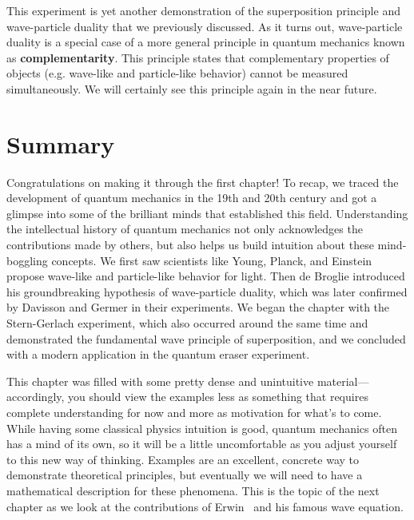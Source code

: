 This experiment is yet another demonstration of the superposition principle and wave-particle duality that we previously discussed. As it turns out, wave-particle duality is a special case of a more general principle in quantum mechanics known as \textbf{complementarity}. This principle states that complementary properties of objects (e.g. wave-like and particle-like behavior) cannot be measured simultaneously. We will certainly see this principle again in the near future.


\section{Summary}
Congratulations on making it through the first chapter! To recap, we traced the development of quantum mechanics in the 19th and 20th century and got a glimpse into some of the brilliant minds that established this field. Understanding the intellectual history of quantum mechanics not only acknowledges the contributions made by others, but also helps us build intuition about these mind-boggling concepts. We first saw scientists like Young, Planck, and Einstein propose wave-like and particle-like behavior for light. Then de Broglie introduced his groundbreaking hypothesis of wave-particle duality, which was later confirmed by Davisson and Germer in their experiments. We began the chapter with the Stern-Gerlach experiment, which also occurred around the same time and demonstrated the fundamental wave principle of superposition, and we concluded with a modern application in the quantum eraser experiment. \par

This chapter was filled with some pretty dense and unintuitive material---accordingly, you should view the examples less as something that requires complete understanding for now and more as motivation for what's to come. While having some classical physics intuition is good, quantum mechanics often has a mind of its own, so it will be a little uncomfortable as you adjust yourself to this new way of thinking. Examples are an excellent, concrete way to demonstrate theoretical principles, but eventually we will need to have a mathematical description for these phenomena. This is the topic of the next chapter as we look at the contributions of Erwin \Sch\ and his famous wave equation.

%
